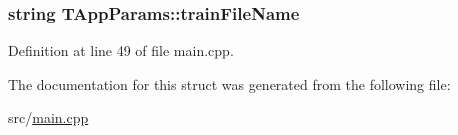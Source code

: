 \subsubsection[{train\+File\+Name}]{\setlength{\rightskip}{0pt plus 5cm}string T\+App\+Params\+::train\+File\+Name}\label{struct_t_app_params_a063fb4df929a287131eecbaa44b02d90}


Definition at line 49 of file main.\+cpp.



The documentation for this struct was generated from the following file\+:\begin{DoxyCompactItemize}
\item 
src/\hyperlink{main_8cpp}{main.\+cpp}\end{DoxyCompactItemize}

